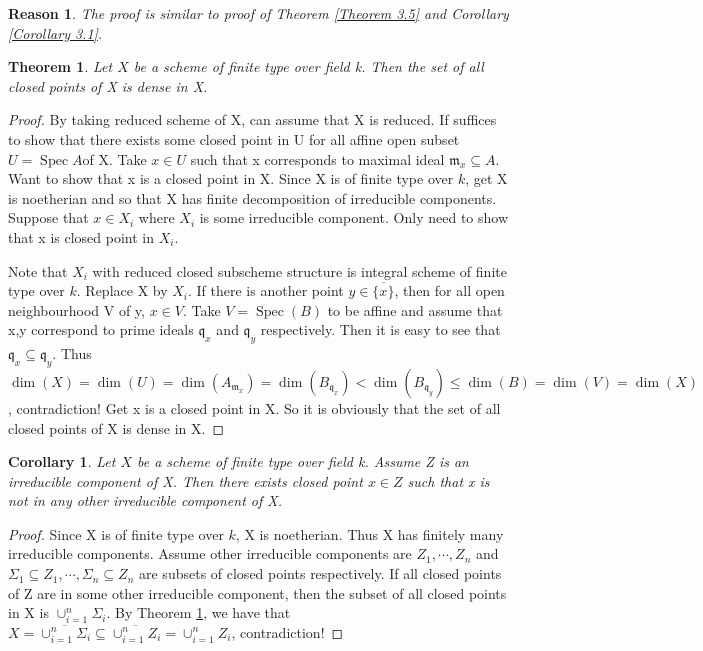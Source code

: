 \documentclass{ctexart}
\newtheorem{theorem}{Theorem}[section]
\newtheorem{reason}{Reason}[section]
\newtheorem{corollary}{Corollary}[section]
\newcommand{\spec}{\operatorname{Spec}}
\begin{document}
\begin{reason}
    The proof is similar to proof of Theorem \ref{Theorem 3.5} and Corollary \ref{Corollary 3.1}.
\end{reason}
\begin{theorem}
    Let $X$ be a scheme of finite type over field k.
    Then the set of all closed points of X is dense in X.
    \label{Theorem 3.6}
\end{theorem}
\begin{proof}
    By taking reduced scheme of X, can assume that X is reduced.
    If suffices to show that there exists some closed point in U for all affine open subset $U = \spec A$of X.
    Take $x\in U$ such that x corresponds to maximal ideal $\mathfrak{m}_{x}\subseteq A$.
    Want to show that x is a closed point in X.
    Since X is of finite type over $k$, get X is noetherian and so that X has finite decomposition of irreducible components.
    Suppose that $x\in X_{i}$ where $X_{i}$ is some irreducible component.
    Only need to show that x is closed point in $X_{i}$. 
    \par
    Note that $X_{i}$ with reduced closed subscheme structure is integral scheme of finite type over $k$.
    Replace X by $X_{i}$.
    If there is another point $y\in \overline{\{x\}}$, then for all open neighbourhood V of y, $x\in V$.
    Take $V = \spec(B)$ to be affine and assume that x,y correspond to prime ideals $\mathfrak{q}_{x}$ and $\mathfrak{q}_{y}$ respectively.
    Then it is easy to see that $\mathfrak{q}_{x} \subseteq \mathfrak{q}_{y}$.
    Thus $\dim(X) = \dim(U) = \dim(A_{\mathfrak{m}_{x}}) = \dim(B_{\mathfrak{q}_{x}}) < \dim(B_{\mathfrak{q}_{y}}) \le \dim(B) = \dim(V) = \dim(X)$, contradiction!
    Get x is a closed point in X.
    So it is obviously that the set of all closed points of X is dense in X.
\end{proof}
\begin{corollary}
    Let $X$ be a scheme of finite type over field k.
    Assume Z is an irreducible component of X.
    Then there exists closed point $x\in Z$ such that x is not in any other irreducible component of X.
    \label{Corollary 3.2}
\end{corollary}
\begin{proof}
    Since X is of finite type over $k$, X is noetherian.
    Thus X has finitely many irreducible components.
    Assume other irreducible components are $Z_{1}, \cdots, Z_{n}$ and $\Sigma_{1} \subseteq Z_{1}, \cdots, \Sigma_{n} \subseteq Z_{n}$ are subsets of closed points respectively.
    If all closed points of Z are in some other irreducible component, then the subset of all closed points in X is $\cup_{i = 1}^{n} \Sigma_{i}$.
    By Theorem \ref{Theorem 3.6}, we have that $X = \overline{\cup_{i = 1}^{n} \Sigma_{i}} \subseteq \overline{\cup_{i = 1}^{n} Z_{i}} = \cup_{i = 1}^{n} Z_{i}$, contradiction!
\end{proof}
\end{document}
